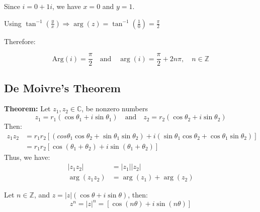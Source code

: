 \documentclass[a4paper, 10pt]{article}
\begin{document}
\begin{examplebox}
  Since $i = 0 + 1i$, we have $x = 0$ and $y = 1$.

  Using $\tan^{-1}\left(\frac{y}{x}\right) \Rightarrow \arg(z) = \tan^{-1}\left(\frac{1}{0}\right) = \frac{\pi}{2}$


  Therefore:

  $$ \text{Arg}(i) = \frac{\pi}{2} \quad \text{and} \quad \arg(i) = \frac{\pi}{2} + 2n\pi, \quad n \in \mathbb{Z} $$
\end{examplebox}

\subsection{De Moivre's Theorem}
\textbf{Theorem:} Let $z_1,z_2 \in \mathbb{C}$, be nonzero numbers
$$z_1 = r_1(\cos\theta_1 + i\sin\theta_1) \quad \text{and} \quad z_2 = r_2(\cos\theta_2 + i\sin\theta_2)$$
Then:
\begin{align*}
  z_1z_2 & = r_1r_2[(cos\theta_1\cos\theta_2  + \sin\theta_1\sin\theta_2) + i(\sin\theta_1\cos\theta_2 + \cos\theta_1\sin\theta_2)] \\
         & = r_1r_2[\cos(\theta_1 + \theta_2) + i\sin(\theta_1 + \theta_2)]
\end{align*}
Thus, we have:
\begin{align*}
  |z_1z_2|     & = |z_1||z_2|            \\
  \arg(z_1z_2) & = \arg(z_1) + \arg(z_2)
\end{align*}

\begin{theorembox}
  Let $n \in \mathbb{Z}$, and $z = |z|(\cos\theta + i\sin\theta)$, then:
  $$z^n = |z|^n = [\cos(n\theta) + i\sin(n\theta)]$$
\end{theorembox}
\end{document}
